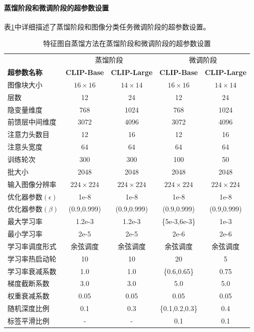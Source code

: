 \paragraph{蒸馏阶段和微调阶段的超参数设置}
表\ref{tab:fd-hyper-pretrain}中详细描述了蒸馏阶段和图像分类任务微调阶段的超参数设置。

\begin{table}
    \centering
    \caption{特征图自蒸馏方法在蒸馏阶段和微调阶段的超参数设置}
    \begin{tabular}{lcccc}
    \toprule
        & \multicolumn{2}{c}{蒸馏阶段} & \multicolumn{2}{c}{微调阶段} \\
        \bf 超参数名称 & \bf CLIP-Base & \bf CLIP-Large & \bf CLIP-Base & \bf CLIP-Large \\
        \midrule
            图像块大小 & $16 \times 16$ & $14 \times 14$ & $16 \times 16$ & $14 \times 14$ \\
            层数  & 12 & 24 & 12 & 24\\
            隐变量维度 & 768 & 1024 & 768 & 1024\\
            前馈层中间维度 & 3072 & 4096 & 3072 & 4096 \\
            注意力头数目 & 12 & 16 & 12 & 16 \\
            注意头宽度 & 64 & 64 & 64 & 64 \\
        \midrule
            训练轮次 & 300 & 300 & 100 & 50 \\
            批大小 & 2048 & 2048 & 2048 & 2048  \\
            输入图像分辨率 & $224 \times 224$& $224 \times 224$& $224 \times 224$& $224 \times 224$\\
            优化器参数$(\epsilon)$ & 1e-8 & 1e-8 & 1e-8 & 1e-8  \\
            优化器参数$(\beta)$ & (0.9,0.999)& (0.9,0.999)& (0.9,0.999)& (0.9,0.999)  \\
            最大学习率 & 1.2e-3 & 1.2e-3 & \{5e-3,6e-3\} & 1e-3  \\
            最小学习率 & 2e-5 & 2e-5 & 2e-6 & 2e-6 \\
            学习率调度形式 & 余弦调度 & 余弦调度 & 余弦调度 & 余弦调度 \\
            学习率热启动轮 & 10 & 10 & 20 & 5 \\
            学习率衰减系数 & 1.0 & 1.0 & \{0.6,0.65\} & 0.75 \\
        \midrule
            梯度截断系数 & 3.0 & 3.0 & 5.0 & 5.0 \\
            权重衰减系数 & 0.05 & 0.05 & 0.05 & 0.05\\
            随机深度比例 & 0.1 & 0.3 & \{0.1,0.2,0.3\} & 0.4 \\
            标签平滑比例 & - & - & 0.1 & 0.1 \\
        \bottomrule
    \end{tabular}
    \label{tab:fd-hyper-pretrain}
\end{table}

